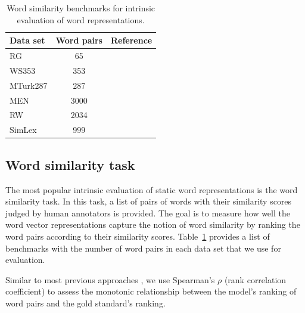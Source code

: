 \begin{table}[htb!]
\centering
\small
\caption{Word similarity benchmarks for intrinsic evaluation of word representations. \label{wstab}}
\begin{tabular}{lcl}%
\toprule
\textbf{Data set} & \textbf{Word pairs} & \textbf{Reference} \\
\midrule
RG & 65 & \citet{Rubenstein:1965:CCS:365628.365657} \\ %
WS353 & 353 &  \citet{Finkelstein:2001:PSC:371920.372094} \\ %
MTurk287 & 287 &  \citet{Radinsky:2011:WTC:1963405.1963455} \\ %
MEN & 3000 &  \citet{bruni-etal-2012-distributional} \\ %
RW & 2034 &  \citet{luong-etal-2013-better} \\ %
SimLex & 999 &  \citet{hill-etal-2015-simlex} \\ %
\bottomrule
\end{tabular}
\end{table}

\subsection{Word similarity task}

The most popular intrinsic evaluation of static word representations is the word similarity task. 
In this task, a list of pairs of words with their similarity scores judged by human annotators is provided. 
The goal is to measure how well the word vector representations capture the notion of word similarity by ranking the word pairs according to their similarity scores. 
Table~\ref{wstab} provides a list of benchmarks with the number of word pairs in each data set that we use for evaluation. 

Similar to most previous approaches \citep{Radinsky:2011:WTC:1963405.1963455,hassan2011semantic,yih-qazvinian-2012-measuring}, we use Spearman's $\rho$ (rank correlation coefficient) to assess the monotonic relationship between the model's ranking of word pairs and the gold standard's ranking. 

